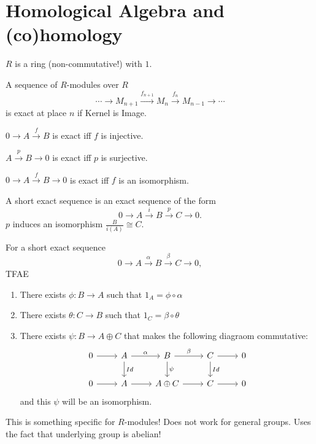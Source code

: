 \part{Homological Algebra and (co)homology}


$R$ is a ring (non-commutative!) with $1$.

\begin{definition}
    A sequence of $R$-modules over $R$ 
    \[
    \cdots \to  M_{n+1} \xrightarrow{f_{n+1}}  M_n  \xrightarrow{f_n}   M_{n-1} \to \cdots
    \] 
    is exact at place $n$ if Kernel is Image.
\end{definition}

\begin{eg}
    $0 \to  A \xrightarrow{f}  B $ is exact iff $f$ is injective.
\end{eg}
\begin{eg}
    $A \xrightarrow{p} B \to  0$ is exact iff $p$ is surjective.
\end{eg}
\begin{eg}
    $0 \to  A \xrightarrow{f}  B \to  0$ is exact iff $f$ is an isomorphism.
\end{eg}
\begin{definition}
   A short exact sequence is an exact sequence of the form
   \[
   0 \to  A \xrightarrow{i} B \xrightarrow{p} C \to  0
   .\] 
   $p$ induces an isomorphism $\frac{B}{i(A)} \cong C$.
\end{definition}

\begin{lemma}[1.3]
    For a short exact sequence 
    \[
    0 \to  A \xrightarrow{\alpha}   B  \xrightarrow{\beta}   C \to  0
    ,\] 
    TFAE
    \begin{enumerate}[(1)]
        \item  There exists $\phi: B \to  A$ such that $1_A = \phi  \circ  \alpha$
        \item There exists $\theta: C \to  B$ such that $1_C = \beta  \circ  \theta$ 
        \item  There exists $\psi: B \to  A \oplus C$ that makes the following diagraom commutative:
            \[
                \begin{tikzcd}
                    0 \arrow[r, ""] & A \arrow[r, "\alpha"] \arrow[d, "Id"]& B \arrow[r, "\beta"] \arrow[d, "\psi"] &C \arrow[r, ""] \arrow[d, "Id"]&  0\\
                    0 \arrow[r, ""]& A \arrow[r, ""] & A \oplus C \arrow[r, ""] & C \arrow[r, " "]& 0
                \end{tikzcd}
            \]
            and this $\psi$ will be an isomorphism.
    \end{enumerate}
\end{lemma}
This is something specific for $R$-modules! Does not work for general groups. Uses the fact that underlying group is abelian!

